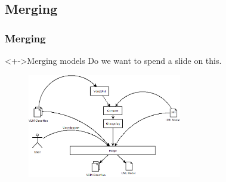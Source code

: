 \subsection{Merging}
%
%
\frame
{
  \frametitle{Merging}

\begin{center}
	\begin{block}<+->{Merging models}
	Do we want to spend a slide on this.
	\end{block}

\begin{figure}
\includegraphics[width=0.6\textwidth]{images/Merge.png}
\end{figure}

\end{center}
}



